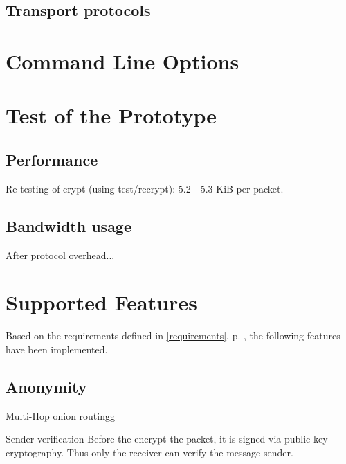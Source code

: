 \subsection{Transport protocols}
\section{Command Line Options}

\section{Test of the Prototype}


\subsection{Performance}
Re-testing of crypt (using test/recrypt): 5.2 - 5.3 KiB per packet.

\subsection{Bandwidth usage}
After protocol overhead...



\section{Supported Features}
Based on the requirements defined in \ref{requirements}, 
p. \pageref{requirements}, the following features have been implemented. 

\subsection{Anonymity}
Multi-Hop onion routingg

Sender verification
Before the encrypt the packet, it is signed via public-key
cryptography\cite{pgp-1}. Thus only the receiver can verify the message sender.


